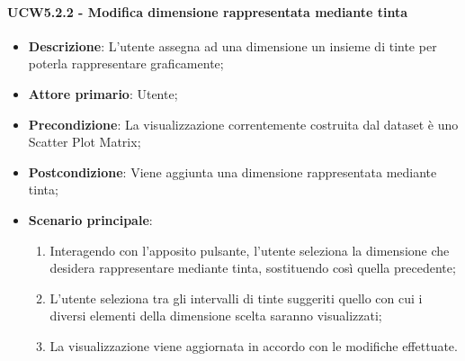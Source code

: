 \paragraph{UCW5.2.2 - Modifica dimensione rappresentata mediante tinta}
\label{par:ucw5.2.2}
\begin{itemize}

    \item \textbf{Descrizione}:     L'utente assegna ad una dimensione un insieme di tinte per poterla rappresentare
          graficamente;

    \item \textbf{Attore primario}: Utente;
    \item \textbf{Precondizione}:   La visualizzazione correntemente costruita dal dataset è uno Scatter Plot Matrix;
    \item \textbf{Postcondizione}:  Viene aggiunta una dimensione rappresentata mediante tinta;
    \item \textbf{Scenario principale}:
          \begin{enumerate}

              \item   Interagendo con l'apposito pulsante, l'utente seleziona la dimensione che desidera rappresentare
                    mediante tinta, sostituendo così quella precedente;

              \item   L'utente seleziona tra gli intervalli di tinte suggeriti quello con cui i diversi elementi della
                    dimensione scelta saranno visualizzati;

              \item   La visualizzazione viene aggiornata in accordo con le modifiche effettuate.
          \end{enumerate}
\end{itemize}


